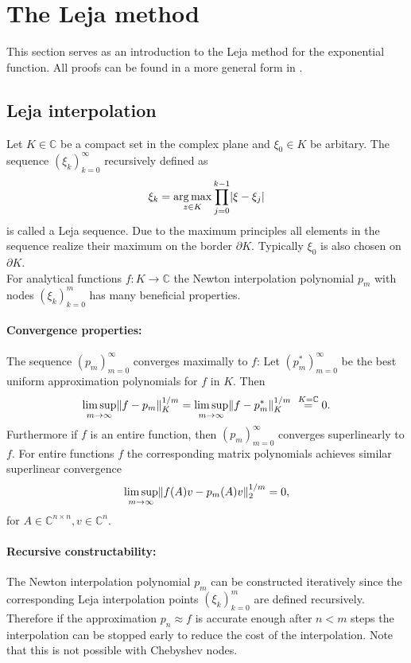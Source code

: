 \documentclass{scrartcl}
\begin{document}
\section{The Leja method}
This section serves as an introduction to the Leja method for the exponential function. All proofs can be found in a more general form in \cite{advdif}. 

\subsection{Leja interpolation}
Let $K\in\mathbb{C}$ be a compact set in the complex plane and $\xi_0\in K$ be arbitary. The sequence $(\xi_k)_{k=0}^{\infty}$ recursively defined as
\[\xi_k = \underset{{z\in K}}{\operatorname{arg\,max}}\displaystyle\prod_{j=0}^{k-1}\lvert\xi-\xi_j\rvert\]
is called a Leja sequence. Due to the maximum principles all elements in the sequence realize their maximum on the border $\partial K$. Typically $\xi_0$ is also chosen on $\partial K$.\\
For analytical functions $f\!:K\to\mathbb{C}$ the Newton interpolation polynomial $p_m$ with nodes $(\xi_k)_{k=0}^{m}$ has many beneficial properties. 
\paragraph{Convergence properties:}
The sequence $(p_m)_{m=0}^\infty$ converges maximally to $f$: Let $(p_m^{*})_{m=0}^\infty$ be the best uniform approximation polynomials for $f$ in $K$. Then
\[\limsup\limits_{m \rightarrow \infty}\lVert f-p_m\rVert_{K}^{1/m} = \limsup\limits_{m \rightarrow \infty}\lVert f-p_m^{*}\rVert_{K}^{1/m} \ \overset{{K=\mathbb{C}}}{=} 0. \]
Furthermore if $f$ is an entire function, then $(p_m)_{m=0}^\infty$ converges superlinearly to $f$. For entire functions $f$ the corresponding matrix polynomials achieves similar superlinear convergence
\[\limsup\limits_{m \rightarrow \infty}\lVert f(A)v-p_m(A)v\rVert_{2}^{1/m} = 0, \]
for $A\in\mathbb{C}^{n\times n}, v\in\mathbb{C}^n$.

\paragraph{Recursive constructability:}
The Newton interpolation polynomial $p_m$ can be constructed iteratively since the corresponding Leja interpolation points $(\xi_k)_{k=0}^{m}$ are defined recursively. Therefore if the approximation $p_n \approx f$ is accurate enough after $n<m$ steps the interpolation can be stopped early to reduce the cost of the interpolation. Note that this is not possible with Chebyshev nodes.
\end{document}
